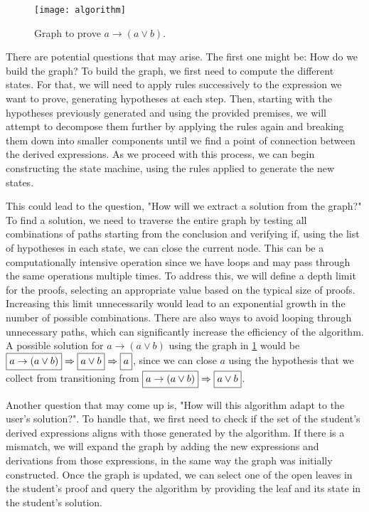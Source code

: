 \begin{figure}[htbp]
    \centering
    \texttt{[image: algorithm]}
    \caption{Graph to prove \(a \to (a \lor b)\).}
    \label{img:algorithm}
\end{figure}

There are potential questions that may arise. The first one might be: How do we build the graph? To build the graph, we first need to compute the different states. For that, we will need to apply rules successively to the expression we want to prove, generating hypotheses at each step. Then, starting with the hypotheses previously generated and using the provided premises, we will attempt to decompose them further by applying the rules again and breaking them down into smaller components until we find a point of connection between the derived expressions. As we proceed with this process, we can begin constructing the state machine, using the rules applied to generate the new states.

This could lead to the question, "How will we extract a solution from the graph?" To find a solution, we need to traverse the entire graph by testing all combinations of paths starting from the conclusion and verifying if, using the list of hypotheses in each state, we can close the current node. This can be a computationally intensive operation since we have loops and may pass through the same operations multiple times. To address this, we will define a depth limit for the proofs, selecting an appropriate value based on the typical size of proofs. Increasing this limit unnecessarily would lead to an exponential growth in the number of possible combinations. There are also ways to avoid looping through unnecessary paths, which can significantly increase the efficiency of the algorithm. A possible solution for \(a \to (a \lor b)\) using the graph in \ref{img:algorithm} would be \(\boxed{a \to (a \lor b)} \Rightarrow \boxed{\vphantom{a \to (a \lor b)}a \lor b} \Rightarrow \boxed{\vphantom{a \to (a \lor b)}a}\), since we can close \(a\) using the hypothesis that we collect from transitioning from \(\boxed{a \to (a \lor b)} \Rightarrow \boxed{\vphantom{a \to (a \lor b)}a \lor b}\).

Another question that may come up is, "How will this algorithm adapt to the user's solution?". To handle that, we first need to check if the set of the student's derived expressions aligns with those generated by the algorithm. If there is a mismatch, we will expand the graph by adding the new expressions and derivations from those expressions, in the same way the graph was initially constructed. Once the graph is updated, we can select one of the open leaves in the student's proof and query the algorithm by providing the leaf and its state in the student's solution.

